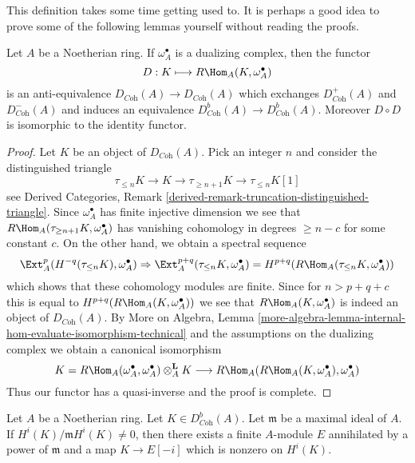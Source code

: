 \noindent
This definition takes some time getting used to. It is perhaps a good
idea to prove some of the following lemmas yourself without reading
the proofs.

\begin{lemma}
\label{lemma-dualizing}
Let $A$ be a Noetherian ring. If $\omega_A^\bullet$ is a dualizing
complex, then the functor
$$
D : K \longmapsto R\Hom_A(K, \omega_A^\bullet)
$$
is an anti-equivalence $D_{\textit{Coh}}(A) \to D_{\textit{Coh}}(A)$
which exchanges $D^+_{\textit{Coh}}(A)$ and $D^-_{\textit{Coh}}(A)$
and induces an equivalence $D^b_{\textit{Coh}}(A) \to D^b_{\textit{Coh}}(A)$.
Moreover $D \circ D$ is isomorphic to the identity functor.
\end{lemma}

\begin{proof}
Let $K$ be an object of $D_{\textit{Coh}}(A)$. Pick an integer $n$ and
consider the distinguished triangle
$$
\tau_{\leq n}K \to K \to \tau_{\geq n + 1}K \to \tau_{\leq n}K[1]
$$
see Derived Categories, Remark
\ref{derived-remark-truncation-distinguished-triangle}.
Since $\omega_A^\bullet$ has finite injective dimension we see
that $R\Hom_A(\tau_{\geq n + 1}K, \omega_A^\bullet)$ has vanishing
cohomology in degrees $\geq n - c$ for some constant $c$.
On the other hand, we obtain a spectral sequence
$$
\Ext_A^p(H^{-q}(\tau_{\leq n}K), \omega_A^\bullet)
\Rightarrow
\Ext_A^{p + q}(\tau_{\leq n}K, \omega_A^\bullet) =
H^{p + q}(R\Hom_A(\tau_{\leq n}K, \omega_A^\bullet))
$$
which shows that these cohomology modules are finite. Since for
$n > p + q + c$ this is equal to $H^{p + q}(R\Hom_A(K, \omega_A^\bullet))$
we see that $R\Hom_A(K, \omega_A^\bullet)$ is indeed an object
of $D_{\textit{Coh}}(A)$.
By More on Algebra, Lemma
\ref{more-algebra-lemma-internal-hom-evaluate-isomorphism-technical}
and the assumptions on the dualizing complex
we obtain a canonical isomorphism
$$
K = R\Hom_A(\omega_A^\bullet, \omega_A^\bullet) \otimes_A^\mathbf{L} K
\longrightarrow
R\Hom_A(R\Hom_A(K, \omega_A^\bullet), \omega_A^\bullet)
$$
Thus our functor has a quasi-inverse and the proof is complete.
\end{proof}

\begin{lemma}
\label{lemma-detect-cohomology}
Let $A$ be a Noetherian ring. Let $K \in D^b_{\textit{Coh}}(A)$.
Let $\mathfrak m$ be a maximal ideal of $A$.
If $H^i(K)/\mathfrak m H^i(K) \not = 0$, then there exists a finite
$A$-module $E$ annihilated by a power of $\mathfrak m$
and a map $K \to E[-i]$ which is nonzero on $H^i(K)$.
\end{lemma}

